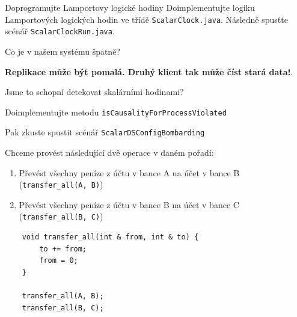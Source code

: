 \documentclass[usenames,dvipsnames,9pt]{beamer}
\begin{document}
{
\begin{frame}

  \begin{block}{Doprogramujte Lamportovy logické hodiny}
    Doimplementujte logiku Lamportových logických hodin ve třídě \texttt{ScalarClock.java}. Následně spusťte scénář \texttt{ScalarClockRun.java}.
  \end{block}

  \pause\vspace{2em}
  \begin{center}
    \LARGE Co je v našem systému špatně?
  \end{center}

  \pause\faWarning \hspace{3pt}
    \textbf{Replikace může být pomalá. Druhý klient tak může číst stará data!}.

  \pause
  \vspace{2em}
  \begin{center}
    {\LARGE Jsme to schopní detekovat skalárními hodinami?}

    \hfill Doimplementujte metodu \texttt{isCausalityForProcessViolated}

    \hfill Pak zkuste spustit scénář \texttt{ScalarDSConfigBombarding}
  \end{center}

\end{frame}
}

\begin{frame}[fragile]
  Chceme provést následující dvě operace v daném pořadí:
  \begin{enumerate}
    \item Převést všechny peníze z účtu v bance A na účet v bance B (\texttt{transfer\_all(A, B)})
    \item Převést všechny peníze z účtu v bance B na účet v bance C (\texttt{transfer\_all(B, C)})
  \end{enumerate}

  \begin{verbatim}
  	void transfer_all(int & from, int & to) {
  		to += from;
  		from = 0;
  	}

  	transfer_all(A, B);
  	transfer_all(B, C);
  \end{verbatim}
\end{frame}
\end{document}
